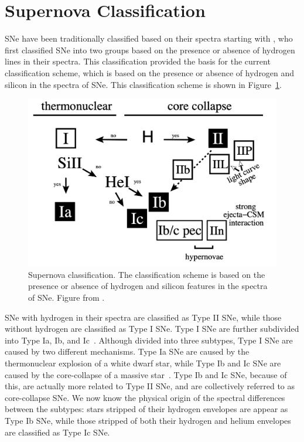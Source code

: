 \section{Supernova Classification}
\label{sec:supernova-classification}
SNe have been traditionally classified based on their spectra starting with 
\textcite{Minkowski1941}, who first classified SNe into two groups based on the
presence or absence of hydrogen lines in their spectra. This classification provided 
the basis for the current classification scheme, which is based on the presence
or absence of hydrogen and silicon in the spectra of SNe. This classification 
scheme is shown in Figure~\ref{fig:sn-classification}. 

\begin{figure}[ht]
    \centering
    \includegraphics[width=0.8\linewidth]{figures/supernova_class.png }
    \caption[Supernova Classification]{Supernova classification. The 
    classification scheme is based on the presence or absence of hydrogen and 
    silicon features in the spectra of SNe. Figure from \textcite{Turatto2003}.}
    \label{fig:sn-classification}
\end{figure}

SNe with hydrogen in their spectra are classified as Type II SNe, while those
without hydrogen are classified as Type I SNe. Type I SNe are further
subdivided into Type Ia, Ib, and Ic~\parencite{Turatto2003}. Although divided into three 
subtypes, Type I SNe are caused by two different mechanisms. Type Ia SNe are 
caused by the thermonuclear explosion of a white dwarf star, while Type Ib and Ic 
SNe are caused by the core-collapse of a massive star~\parencite{Filippenko1997}.
Type Ib and Ic SNe, because of this, are actually more related to Type II SNe,
and are collectively referred to as core-collapse SNe. We now know the physical
origin of the spectral differences between the subtypes: stars stripped of their 
hydrogen envelopes are appear as Type Ib SNe, while those stripped of both their 
hydrogen and helium envelopes are classified as Type Ic SNe.

